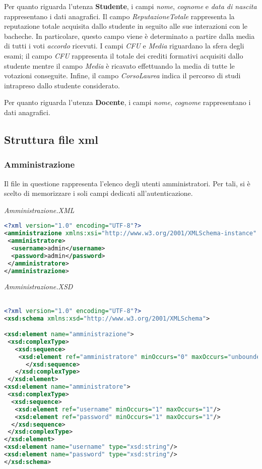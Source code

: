 \documentclass [a4paper,11pt]{book}
\begin{document}
\medskip

Per quanto riguarda l'utenza \textbf{Studente}, i campi \emph{nome}, \emph{cognome} e \emph{data di nascita} rappresentano i dati anagrafici. 
Il campo \emph{ReputazioneTotale} rappresenta la reputazione totale acquisita dallo studente in seguito alle sue interazioni con le bacheche. In particolare, questo campo viene è determinato a partire dalla media di tutti i voti \emph{accordo} ricevuti.
I campi \emph{CFU} e \emph{Media} riguardano la sfera degli esami; il campo \emph{CFU} rappresenta il totale dei crediti formativi acquisiti dallo studente mentre il campo \emph{Media} è ricavato effettuando la media di tutte le votazioni conseguite.
Infine, il campo \emph{CorsoLaurea} indica il percorso di studi intrapreso dallo studente considerato.

\medskip

Per quanto riguarda l'utenza \textbf{Docente}, i campi \emph{nome}, \emph{cognome} rappresentano i dati anagrafici.

\subsection{Struttura file xml}

\subsubsection{Amministrazione}

Il file in questione rappresenta l'elenco degli utenti amministratori. Per tali, si è scelto di memorizzare i soli campi dedicati all'autenticazione.

\medskip

\emph{Amministrazione.XML}

\begin{lstlisting}[language=XML]
<?xml version="1.0" encoding="UTF-8"?>
<amministrazione xmlns:xsi="http://www.w3.org/2001/XMLSchema-instance" xsi:noNamespaceSchemaLocation="amministrazione.xsd">
 <amministratore>
  <username>admin</username>
  <password>admin</password>
 </amministratore>
</amministrazione>
\end{lstlisting}

\medskip

\emph{Amministrazione.XSD}

\begin{lstlisting}[language=XML]

<?xml version="1.0" encoding="UTF-8"?>
<xsd:schema xmlns:xsd="http://www.w3.org/2001/XMLSchema">

<xsd:element name="amministrazione">
 <xsd:complexType>
   <xsd:sequence>
    <xsd:element ref="amministratore" minOccurs="0" maxOccurs="unbounded" />
      </xsd:sequence>
   </xsd:complexType>
 </xsd:element>
<xsd:element name="amministratore">
 <xsd:complexType>
  <xsd:sequence>
   <xsd:element ref="username" minOccurs="1" maxOccurs="1"/>
   <xsd:element ref="password" minOccurs="1" maxOccurs="1"/>
  </xsd:sequence>
 </xsd:complexType>
</xsd:element>
<xsd:element name="username" type="xsd:string"/>
<xsd:element name="password" type="xsd:string"/>
</xsd:schema>
\end{lstlisting}
\end{document}
